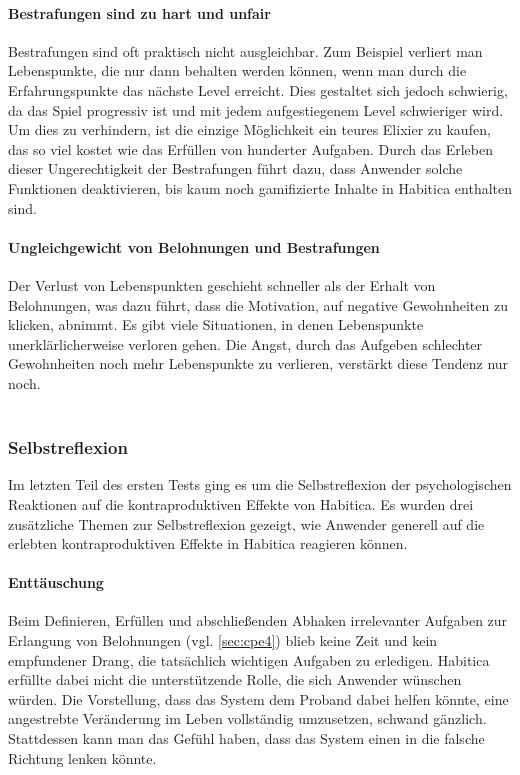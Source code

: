 \documentclass[sigconf, nonacm]{acmart}
\begin{document}
\paragraph{Bestrafungen sind zu hart und unfair}\label{sec:acpe3}
Bestrafungen sind oft praktisch nicht ausgleichbar. Zum Beispiel verliert man Lebenspunkte, die nur dann behalten werden können, wenn man durch die Erfahrungspunkte das nächste Level erreicht. Dies gestaltet sich jedoch schwierig, da das Spiel progressiv ist und mit jedem aufgestiegenem Level schwieriger wird. Um dies zu verhindern, ist die einzige Möglichkeit ein teures Elixier zu kaufen, das so viel kostet wie das Erfüllen von hunderter Aufgaben. Durch das Erleben dieser Ungerechtigkeit der Bestrafungen führt dazu, dass Anwender solche Funktionen deaktivieren, bis kaum noch gamifizierte Inhalte in Habitica enthalten sind.

\paragraph{Ungleichgewicht von Belohnungen und Bestrafungen}\label{sec:acpe4}
Der Verlust von Lebenspunkten geschieht schneller als der Erhalt von Belohnungen, was dazu führt, dass die Motivation, auf negative Gewohnheiten zu klicken, abnimmt. Es gibt viele Situationen, in denen Lebenspunkte unerklärlicherweise verloren gehen. Die Angst, durch das Aufgeben schlechter Gewohnheiten noch mehr Lebenspunkte zu verlieren, verstärkt diese Tendenz nur noch.
\\
\\
\subsubsection{Selbstreflexion}
Im letzten Teil des ersten Tests ging es um die Selbstreflexion der psychologischen Reaktionen auf die kontraproduktiven Effekte von Habitica. Es wurden drei zusätzliche Themen zur Selbstreflexion gezeigt, wie Anwender generell auf die erlebten kontraproduktiven Effekte in Habitica reagieren können.

\paragraph{Enttäuschung}\label{sec:sr1}
Beim Definieren, Erfüllen und abschließenden Abhaken irrelevanter Aufgaben zur Erlangung von Belohnungen (vgl. \ref{sec:cpe4}) blieb keine Zeit und kein empfundener Drang, die tatsächlich wichtigen Aufgaben zu erledigen. Habitica erfüllte dabei nicht die unterstützende Rolle, die sich Anwender wünschen würden. Die Vorstellung, dass das System dem Proband dabei helfen könnte, eine angestrebte Veränderung im Leben vollständig umzusetzen, schwand gänzlich. Stattdessen kann man das Gefühl haben, dass das System einen in die falsche Richtung lenken könnte.
\end{document}
